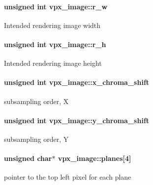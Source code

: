 \paragraph[{\texorpdfstring{r\+\_\+w}{r_w}}]{\setlength{\rightskip}{0pt plus 5cm}unsigned int vpx\+\_\+image\+::r\+\_\+w}\hypertarget{structvpx__image_a1fe4736c2554836d510589cdbbece76a}{}\label{structvpx__image_a1fe4736c2554836d510589cdbbece76a}
Intended rendering image width 
\paragraph[{\texorpdfstring{r\+\_\+h}{r_h}}]{\setlength{\rightskip}{0pt plus 5cm}unsigned int vpx\+\_\+image\+::r\+\_\+h}\hypertarget{structvpx__image_ad969a04e4a11749f3718ef5909db6da8}{}\label{structvpx__image_ad969a04e4a11749f3718ef5909db6da8}
Intended rendering image height 
\paragraph[{\texorpdfstring{x\+\_\+chroma\+\_\+shift}{x_chroma_shift}}]{\setlength{\rightskip}{0pt plus 5cm}unsigned int vpx\+\_\+image\+::x\+\_\+chroma\+\_\+shift}\hypertarget{structvpx__image_affaf210489dcefebd90b87fd5f12dc0b}{}\label{structvpx__image_affaf210489dcefebd90b87fd5f12dc0b}
subsampling order, X 
\paragraph[{\texorpdfstring{y\+\_\+chroma\+\_\+shift}{y_chroma_shift}}]{\setlength{\rightskip}{0pt plus 5cm}unsigned int vpx\+\_\+image\+::y\+\_\+chroma\+\_\+shift}\hypertarget{structvpx__image_a1e3d9b699d46ca32e3916d1ac635a4a2}{}\label{structvpx__image_a1e3d9b699d46ca32e3916d1ac635a4a2}
subsampling order, Y 
\paragraph[{\texorpdfstring{planes}{planes}}]{\setlength{\rightskip}{0pt plus 5cm}unsigned char$\ast$ vpx\+\_\+image\+::planes\mbox{[}4\mbox{]}}\hypertarget{structvpx__image_ab6258308ba7a5f4a113348120e20e2ce}{}\label{structvpx__image_ab6258308ba7a5f4a113348120e20e2ce}
pointer to the top left pixel for each plane 
